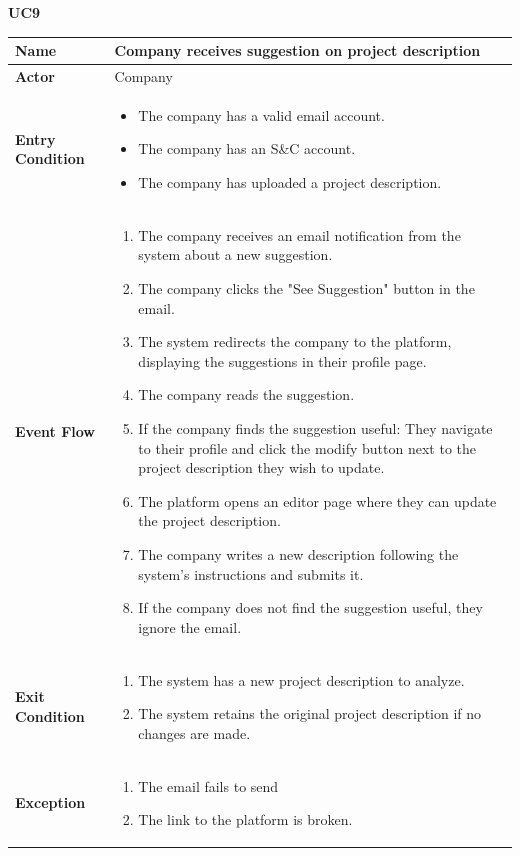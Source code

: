 \pagebreak
\textbf{UC9}
\begin{longtable}{|p{}|p{}|}
\hline
\textbf{Name} &  Company receives suggestion on project description\\
\hline
\textbf{Actor} &  Company\\
\hline
\textbf{Entry Condition} &  
\begin{itemize}
    \item  The company has a valid email account.
    \item  The company has an S\&C account.
    \item  The company has uploaded a project description.
\end{itemize}\\
\hline
\textbf{Event Flow} &  
\begin{enumerate}
    \item The company receives an email notification from the system about a new suggestion.
    \item The company clicks the "See Suggestion" button in the email.
    \item The system redirects the company to the platform, displaying the suggestions in their profile page.
    \item The company reads the suggestion.
    \item  If the company finds the suggestion useful: They navigate to their profile and click the modify button next to the project description they wish to update.
    \item The platform opens an editor page where they can update the project description.
    \item The company writes a new description following the system’s instructions and submits it.
    \item If the company does not find the suggestion useful, they ignore the email.
\end{enumerate}\\
\hline
\textbf{Exit Condition} &  
\begin{enumerate}
    \item The system has a new project description to analyze.
    \item  The system retains the original project description if no changes are made.
\end{enumerate}\\
\hline
\textbf{Exception} &  
\begin{enumerate}
    \item The email fails to send
    \item The link to the platform is broken.
\end{enumerate}\\
\hline
\end{longtable}

